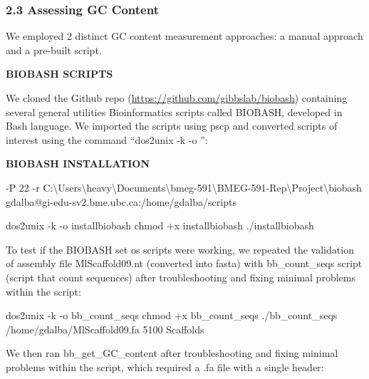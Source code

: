\documentclass[
]{article}
\newenvironment{Shaded}{\begin{snugshade}}{\end{snugshade}}
\newcommand{\ExtensionTok}[1]{#1}
\newcommand{\FunctionTok}[1]{\textcolor[rgb]{0.00,0.00,0.00}{#1}}
\newcommand{\NormalTok}[1]{#1}
\begin{document}
\hypertarget{assessing-gc-content}{%
\subsubsection{2.3 Assessing GC Content}\label{assessing-gc-content}}

We employed 2 distinct GC content measurement approaches: a manual
approach and a pre-built script.

\textbf{BIOBASH SCRIPTS}

We cloned the Github repo (\url{https://github.com/gibbslab/biobash})
containing several general utilities Bioinformatics scripts called
BIOBASH, developed in Bash language. We imported the scripts using pscp
and converted scripts of interest using the command ``dos2unix -k -o '':

\textbf{BIOBASH INSTALLATION}

\begin{Shaded}
\begin{Highlighting}[]

\ExtensionTok{{-}P}\NormalTok{ 22 {-}r C:\textbackslash{}Users\textbackslash{}heavy\textbackslash{}Documents\textbackslash{}bmeg{-}591\textbackslash{}BMEG{-}591{-}Rep\textbackslash{}Project\textbackslash{}biobash gdalba@gi{-}edu{-}sv2.bme.ubc.ca:/home/gdalba/scripts}

\ExtensionTok{dos2unix}\NormalTok{ {-}k {-}o installbiobash}
\FunctionTok{chmod}\NormalTok{ +x installbiobash}
\ExtensionTok{./installbiobash}
\end{Highlighting}
\end{Shaded}

To test if the BIOBASH set os scripts were working, we repeated the
validation of assembly file MlScaffold09.nt (converted into fasta) with
bb\_count\_seqs script (script that count sequences) after
troubleshooting and fixing minimal problems within the script:

\begin{Shaded}
\begin{Highlighting}[]

\ExtensionTok{dos2unix}\NormalTok{ {-}k {-}o bb\_count\_seqs}
\FunctionTok{chmod}\NormalTok{ +x bb\_count\_seqs}
\ExtensionTok{./bb\_count\_seqs}\NormalTok{ /home/gdalba/MlScaffold09.fa}
\ExtensionTok{5100}\NormalTok{ Scaffolds}
\end{Highlighting}
\end{Shaded}

We then ran bb\_get\_GC\_content after troubleshooting and fixing
minimal problems within the script, which required a .fa file with a
single header:
\end{document}
